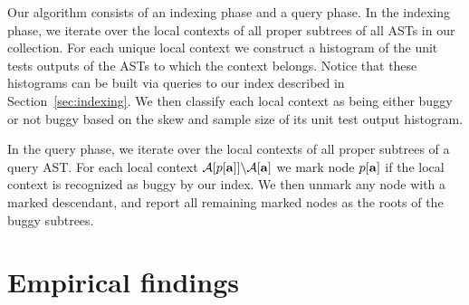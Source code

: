 Our algorithm consists of an indexing phase and a query phase.  In the indexing phase, we iterate over the local contexts of all proper subtrees of all ASTs in our collection.  For each unique local context we construct a histogram of the unit tests outputs of the ASTs to which the context belongs.   Notice that these histograms
can be built via queries to our index described in Section~\ref{sec:indexing}.
We then classify each local context as being either buggy or not buggy based on the skew and sample size of its unit test output histogram.

In the query phase, we iterate over the local contexts of all proper subtrees of a query AST.  For each local context $\mathcal{A}[p[{\bf a}]]\backslash\mathcal{A}[{\bf a}]$ we mark node $p[{\bf a}]$ if the local context is recognized as 
buggy by our index.  We then unmark any node with a marked descendant, and report all remaining marked nodes as the roots of the buggy subtrees.


\section{Empirical findings}\label{sec:evaluation}


